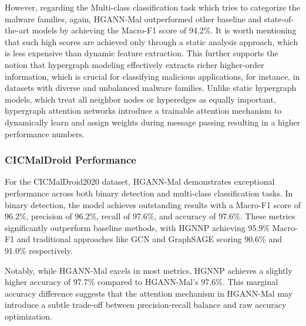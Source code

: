 \documentclass[runningheads]{llncs}
\begin{document}
However, regarding the Multi-class classification task which tries to categorize the malware families, again, HGANN-Mal outperformed other baseline and state-of-the-art models by achieving the Macro-F1 score of 94.2\%. It is worth mentioning that such high scores are achieved only through a static analysis approach, which is less expensive than dynamic feature extraction. This further supports the notion that hypergraph modeling effectively extracts richer higher-order information, which is crucial for classifying malicious applications, for instance, in datasets with diverse and unbalanced malware families. Unlike static hypergraph models, which treat all neighbor nodes or hyperedges as equally important, hypergraph attention networks introduce a trainable attention mechanism to dynamically learn and assign weights during message passing resulting in a higher performance numbers.

\subsubsection{CICMalDroid Performance}
For the CICMalDroid2020 dataset, HGANN-Mal demonstrates exceptional performance across both binary detection and multi-class classification tasks. In binary detection, the model achieves outstanding results with a Macro-F1 score of 96.2\%, precision of 96.2\%, recall of 97.6\%, and accuracy of 97.6\%. These metrics significantly outperform baseline methods, with HGNNP achieving 95.9\% Macro-F1 and traditional approaches like GCN and GraphSAGE scoring 90.6\% and 91.0\% respectively. 

Notably, while HGANN-Mal excels in most metrics, HGNNP achieves a slightly higher accuracy of 97.7\% compared to HGANN-Mal's 97.6\%. This marginal accuracy difference suggests that the attention mechanism in HGANN-Mal may introduce a subtle trade-off between precision-recall balance and raw accuracy optimization.
\end{document}
